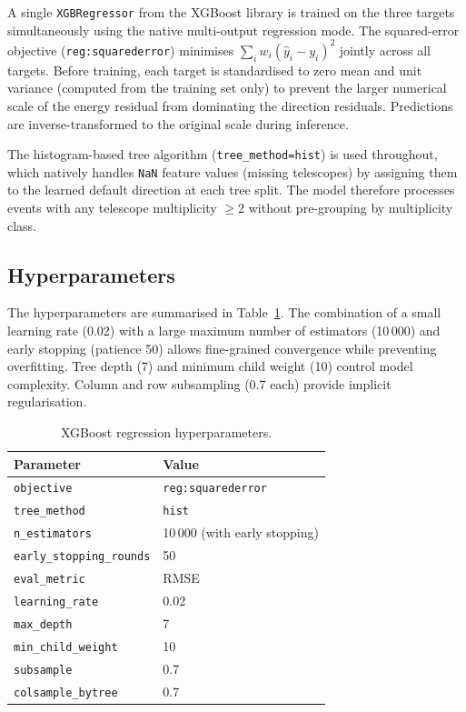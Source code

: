 \documentclass[12pt]{article}
\begin{document}
A single \texttt{XGBRegressor} from the XGBoost library \citep{Chen:2016:XST:2939672.2939785}
is trained on the three targets simultaneously using the
native multi-output regression mode.
The squared-error objective (\texttt{reg:squarederror}) minimises
$\sum_i w_i (\hat{y}_i - y_i)^2$ jointly across all targets.
Before training, each target is standardised to zero mean and unit variance
(computed from the training set only) to prevent the larger numerical scale of
the energy residual from dominating the direction residuals.
Predictions are inverse-transformed to the original scale during inference.

The histogram-based tree algorithm (\texttt{tree\_method=hist}) is used throughout,
which natively handles \texttt{NaN} feature values (missing telescopes)
by assigning them to the learned default direction at each tree split.
The model therefore processes events with any telescope multiplicity
$\geq 2$ without pre-grouping by multiplicity class.

\subsection{Hyperparameters}

The hyperparameters are summarised in Table~\ref{tab:hyperparameters}.
The combination of a small learning rate (0.02) with a large maximum number of
estimators (10\,000) and early stopping (patience 50) allows fine-grained
convergence while preventing overfitting.
Tree depth (7) and minimum child weight (10) control model complexity.
Column and row subsampling (0.7 each) provide implicit regularisation.

\begin{table}[h]
\centering
\caption{XGBoost regression hyperparameters.}
\label{tab:hyperparameters}
\begin{tabular}{ll}
\toprule
\textbf{Parameter} & \textbf{Value} \\
\midrule
\texttt{objective}           & \texttt{reg:squarederror} \\
\texttt{tree\_method}        & \texttt{hist} \\
\texttt{n\_estimators}       & 10\,000 (with early stopping) \\
\texttt{early\_stopping\_rounds} & 50 \\
\texttt{eval\_metric}        & RMSE \\
\texttt{learning\_rate}      & 0.02 \\
\texttt{max\_depth}          & 7 \\
\texttt{min\_child\_weight}  & 10 \\
\texttt{subsample}           & 0.7 \\
\texttt{colsample\_bytree}   & 0.7 \\
\bottomrule
\end{tabular}
\end{table}
\end{document}
